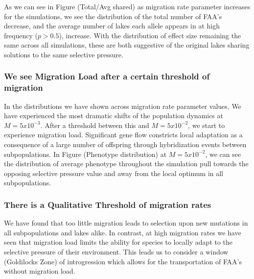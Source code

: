 \documentclass{article}
\begin{document}
As we can see in Figure (Total/Avg shared)
as migration rate parameter increases for the simulations, 
we see the distribution of the total number of FAA's decrease, and 
the average number of lakes each allele appears in at high frequency ($p > 0.5$), increase.
With the distribution of effect size remaining the same across all simulations, 
these are both suggestive of the original lakes sharing solutions to the same selective pressure.




\subsubsection*{We see Migration Load after a certain threshold of migration}



In the distributions we have shown across migration rate parameter values, 
We have experienced the most dramatic shifts of the population dynamics at $M = 5x10^{-3}$.
After a threshold between this and $M = 5x10^{-2}$, we start to experience migration load. 
Significant gene flow constricts local adaptation
as a consequence of a large number of offspring through hybridization events between subpopulations.
In Figure (Phenotype distribution) at $M = 5x10^{-2}$, we can see the distribution of average phenotype throughout the simulation
pull towards the opposing selective pressure value and away from the local optimum in all subpopulations.



	
\subsubsection*{There is a Qualitative Threshold of migration rates}


We have found that too little migration leads to selection upon new mutations in all subpopulations and lakes alike. 
In contrast, at high migration rates we have seen that migration load limits 
the ability for species to locally adapt to the selective pressure of their environment.
This leads us to consider a window (Goldilocks Zone) of introgression which allows for the transportation
of FAA's without migration load. 
\end{document}
